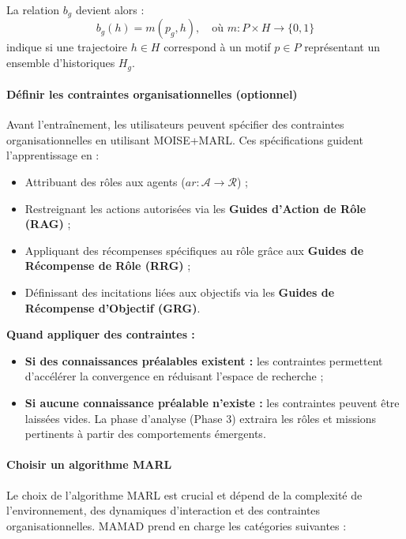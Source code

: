 La relation $b_g$ devient alors :
\[
    b_g(h) = m(p_g, h), \quad \text{où } m: P \times H \to \{0,1\}
\]
indique si une trajectoire $h \in H$ correspond à un motif $p \in P$ représentant un ensemble d'historiques $H_g$.

\paragraph{Définir les contraintes organisationnelles (optionnel)}

Avant l'entraînement, les utilisateurs peuvent spécifier des contraintes organisationnelles en utilisant MOISE+MARL. Ces spécifications guident l'apprentissage en :

\begin{itemize}
    \item Attribuant des rôles aux agents ($ar: \mathcal{A} \to \mathcal{R}$) ;
    \item Restreignant les actions autorisées via les \textbf{Guides d'Action de Rôle (RAG)} ;
    \item Appliquant des récompenses spécifiques au rôle grâce aux \textbf{Guides de Récompense de Rôle (RRG)} ;
    \item Définissant des incitations liées aux objectifs via les \textbf{Guides de Récompense d'Objectif (GRG)}.
\end{itemize}

\vspace{0.4em}
\noindent \textbf{Quand appliquer des contraintes :}
\begin{itemize}
    \item \textbf{Si des connaissances préalables existent :} les contraintes permettent d'accélérer la convergence en réduisant l'espace de recherche ;
    \item \textbf{Si aucune connaissance préalable n'existe :} les contraintes peuvent être laissées vides. La phase d'analyse (Phase 3) extraira les rôles et missions pertinents à partir des comportements émergents.
\end{itemize}

\paragraph{Choisir un algorithme MARL}

Le choix de l'algorithme MARL est crucial et dépend de la complexité de l'environnement, des dynamiques d'interaction et des contraintes organisationnelles. MAMAD prend en charge les catégories suivantes :

